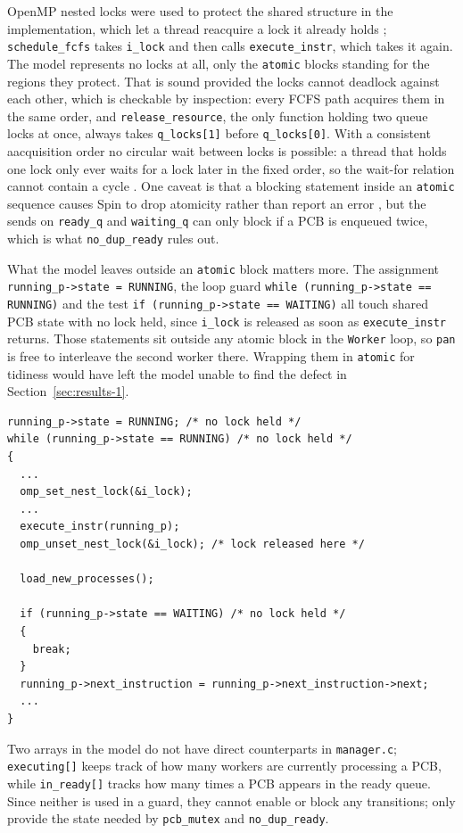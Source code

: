 \documentclass[10pt,a4paper]{article}
\newcommand{\code}[1]{\texttt{#1}}
\begin{document}
OpenMP nested locks were used to protect the shared structure in the implementation,
which let a thread reacquire a lock it already holds \cite{openmp52};
\code{schedule\_fcfs} takes \code{i\_lock} and then calls
\code{execute\_instr}, which takes it again. The model represents no locks at
all, only the \code{atomic} blocks standing for the regions they protect. That
is sound provided the locks cannot deadlock against each other, which is
checkable by inspection: every FCFS path acquires them in the same order, and
\code{release\_resource}, the only function holding two queue locks at once,
always takes \code{q\_locks[1]} before \code{q\_locks[0]}. With a consistent
aacquisition order no circular wait between locks is possible: a thread
that holds one lock only ever waits for a lock later in the fixed order,
so the wait-for relation cannot contain a cycle \cite{baier2008}. One caveat is that a blocking statement inside an \code{atomic} sequence
causes Spin to drop atomicity rather than report an error \cite{spin_atomic},
but the sends on \code{ready\_q} and \code{waiting\_q} can only block if a PCB
is enqueued twice, which is what \code{no\_dup\_ready} rules out.

What the model leaves outside an \code{atomic} block matters more. The
assignment \code{running\_p->state = RUNNING}, the loop guard
\code{while (running\_p->state == RUNNING)} and the test
\code{if (running\_p->state == WAITING)} all touch shared PCB state with no
lock held, since \code{i\_lock} is released as soon as \code{execute\_instr}
returns. Those statements sit outside any atomic block in the \code{Worker}
loop, so \code{pan} is free to interleave the second worker there. Wrapping
them in \code{atomic} for tidiness would have left the model unable to find
the defect in Section~\ref{sec:results-1}.

\begin{lstlisting}[style=clang,caption={Unprotected reads in \code{schedule\_fcfs}, abridged}]
running_p->state = RUNNING; /* no lock held */
while (running_p->state == RUNNING) /* no lock held */
{
  ...
  omp_set_nest_lock(&i_lock);
  ...
  execute_instr(running_p);
  omp_unset_nest_lock(&i_lock); /* lock released here */

  load_new_processes();

  if (running_p->state == WAITING) /* no lock held */
  {
    break;
  }
  running_p->next_instruction = running_p->next_instruction->next;
  ...
}
\end{lstlisting}

Two arrays in the model do not have direct counterparts in \code{manager.c};
\code{executing[]} keeps track of how many workers are currently processing a 
PCB, while \code{in\_ready[]} tracks how many times a PCB appears in the ready 
queue. Since neither is used in a guard, they cannot enable or block any 
transitions; only provide the state needed by \code{pcb\_mutex} and 
\code{no\_dup\_ready}.
\end{document}
